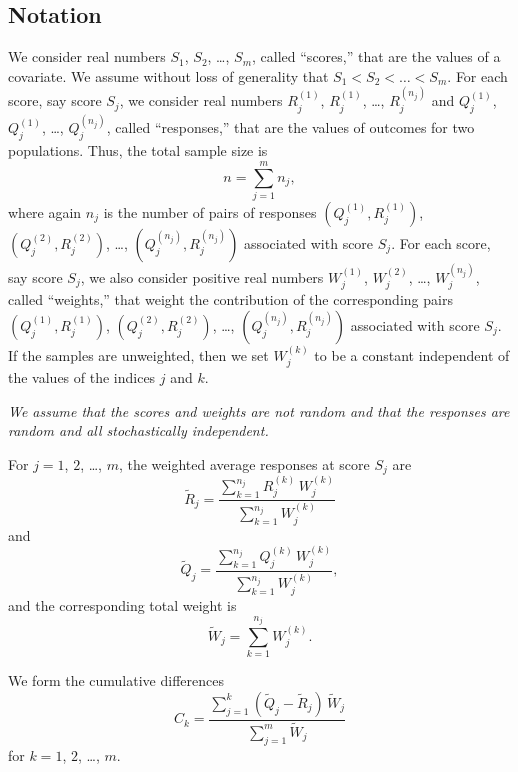 \documentclass[]{fairmeta}
\begin{document}
\subsection{Notation}
\label{notation}

We consider real numbers $S_1$, $S_2$, \dots, $S_m$,
called ``scores,'' that are the values of a covariate.
We assume without loss of generality that $S_1 < S_2 < \dots < S_m$.
For each score, say score $S_j$, we consider real numbers
$R_j^{(1)}$, $R_j^{(1)}$, \dots, $R_j^{(n_j)}$ and
$Q_j^{(1)}$, $Q_j^{(1)}$, \dots, $Q_j^{(n_j)}$,
called ``responses,'' that are the values of outcomes for two populations.
Thus, the total sample size is
%
\begin{equation}
n = \sum_{j=1}^m n_j,
\end{equation}
%
where again $n_j$ is the number of pairs of responses
$(Q_j^{(1)}, R_j^{(1)})$, $(Q_j^{(2)}, R_j^{(2)})$, \dots,
$(Q_j^{(n_j)}, R_j^{(n_j)})$ associated with score $S_j$.
For each score, say score $S_j$, we also consider positive real numbers
$W_j^{(1)}$, $W_j^{(2)}$, \dots, $W_j^{(n_j)}$, called ``weights,''
that weight the contribution of the corresponding pairs
$(Q_j^{(1)}, R_j^{(1)})$, $(Q_j^{(2)}, R_j^{(2)})$, \dots,
$(Q_j^{(n_j)}, R_j^{(n_j)})$ associated with score $S_j$.
If the samples are unweighted, then we set $W_j^{(k)}$ to be a constant
independent of the values of the indices $j$ and $k$.

{\it We assume that the scores and weights are not random
and that the responses are random and all stochastically independent.}

For $j = 1$, $2$, \dots, $m$, the weighted average responses at score $S_j$ are
%
\begin{equation}
\tilde{R}_j = \frac{\sum_{k=1}^{n_j} R_j^{(k)} \, W_j^{(k)}}
                   {\sum_{k=1}^{n_j} W_j^{(k)}}
\end{equation}
%
and
%
\begin{equation}
\tilde{Q}_j = \frac{\sum_{k=1}^{n_j} Q_j^{(k)} \, W_j^{(k)}}
                   {\sum_{k=1}^{n_j} W_j^{(k)}},
\end{equation}
%
and the corresponding total weight is
%
\begin{equation}
\tilde{W}_j = \sum_{k=1}^{n_j} W_j^{(k)}.
\end{equation}

We form the cumulative differences
%
\begin{equation}
\label{cumdiff}
C_k = \frac{\sum_{j=1}^k (\tilde{Q}_j - \tilde{R}_j) \, \tilde{W}_j}
           {\sum_{j=1}^m \tilde{W}_j}
\end{equation}
%
for $k = 1$, $2$, \dots, $m$.
\end{document}
